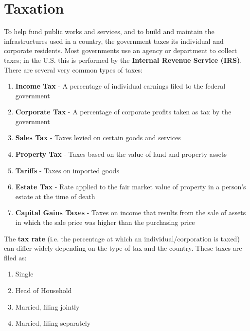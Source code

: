 \documentclass{article}
\begin{document}
\begin{enumerate}
  \end{enumerate}

\section{Taxation}

  \begin{definition}[Taxes]
    To help fund public works and services, and to build and maintain the infrastructures used in a country, the government taxes its individual and corporate residents. Most governments use an agency or department to collect taxes; in the U.S. this is performed by the \textbf{Internal Revenue Service (IRS)}. There are several very common types of taxes: 
    \begin{enumerate}
      \item \textbf{Income Tax} - A percentage of individual earnings filed to the federal government
      \item \textbf{Corporate Tax} - A percentage of corporate profits taken as tax by the government
      \item \textbf{Sales Tax} - Taxes levied on certain goods and services
      \item \textbf{Property Tax} - Taxes based on the value of land and property assets
      \item \textbf{Tariffs} - Taxes on imported goods
      \item \textbf{Estate Tax} - Rate applied to the fair market value of property in a person's estate at the time of death
      \item \textbf{Capital Gains Taxes} - Taxes on income that results from the sale of assets in which the sale price was higher than the purchasing price 
    \end{enumerate}
    The \textbf{tax rate} (i.e. the percentage at which an individual/corporation is taxed) can differ widely depending on the type of tax and the country. These taxes are filed as: 
    \begin{enumerate}
      \item Single
      \item Head of Household
      \item Married, filing jointly
      \item Married, filing separately 
    \end{enumerate}
  \end{definition}
\end{document}
